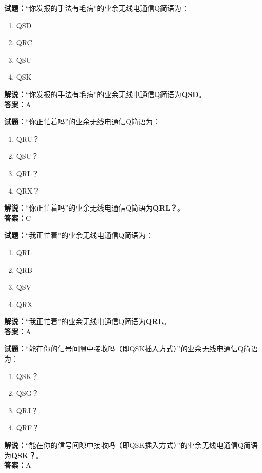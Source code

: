 \documentclass{ctexbook}
\begin{document}
\bigskip


\noindent\textbf{试题：}“你发报的手法有毛病”的业余无线电通信Q简语为：
\begin{enumerate}[leftmargin=3em]
\item QSD
\item QRC
\item QSU
\item QSK
\end{enumerate}
\noindent\textbf{解说：}“你发报的手法有毛病”的业余无线电通信Q简语为\textbf{QSD}。\\\noindent\textbf{答案：}A



\bigskip


\noindent\textbf{试题：}“你正忙着吗”的业余无线电通信Q简语为：
\begin{enumerate}[leftmargin=3em]
\item QRU？
\item QSU？
\item QRL？
\item QRX？
\end{enumerate}
\noindent\textbf{解说：}“你正忙着吗”的业余无线电通信Q简语为\textbf{QRL？}。\\\noindent\textbf{答案：}C



\bigskip


\noindent\textbf{试题：}“我正忙着”的业余无线电通信Q简语为：
\begin{enumerate}[leftmargin=3em]
\item QRL
\item QRB
\item QSV
\item QRX
\end{enumerate}
\noindent\textbf{解说：}“我正忙着”的业余无线电通信Q简语为\textbf{QRL}。\\\noindent\textbf{答案：}A



\bigskip


\noindent\textbf{试题：}“能在你的信号间隙中接收吗（即QSK插入方式）”的业余无线电通信Q简语为：
\begin{enumerate}[leftmargin=3em]
\item QSK？
\item QSG？
\item QRJ？
\item QRF？
\end{enumerate}
\noindent\textbf{解说：}“能在你的信号间隙中接收吗（即QSK插入方式）”的业余无线电通信Q简语为\textbf{QSK？}。\\\noindent\textbf{答案：}A
\end{document}

